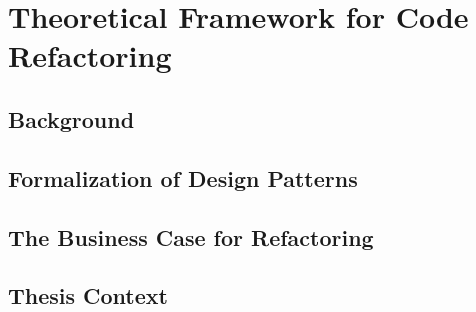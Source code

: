 \chapter{Theoretical Framework for Code Refactoring}

\section{Background}
\section{Formalization of Design Patterns}
\section{The Business Case for Refactoring}
\section{Thesis Context}
